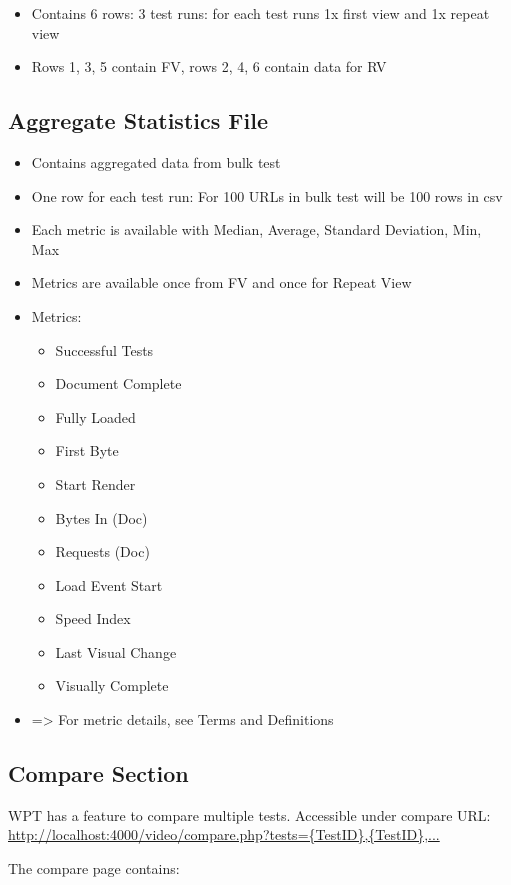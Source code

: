 \begin{itemize}
\item Contains 6 rows: 3 test runs: for each test runs 1x first view and 1x repeat view
\item Rows 1, 3, 5 contain FV, rows 2, 4, 6 contain data for RV
\end{itemize}

\subsection{Aggregate Statistics File}

\begin{itemize}
\item Contains aggregated data from bulk test
\item One row for each test run: For 100 URLs in bulk test will be 100 rows in csv
\item Each metric is available with Median, Average, Standard Deviation, Min, Max
\item Metrics are available once from FV and once for Repeat View
\item Metrics:
	\begin{itemize}
	\item Successful Tests
	\item Document Complete
	\item Fully Loaded
	\item First Byte
	\item Start Render
	\item Bytes In (Doc)
	\item Requests (Doc)
	\item Load Event Start
	\item Speed Index
	\item Last Visual Change
	\item Visually Complete
	\end{itemize}
\item => For metric details, see Terms and Definitions
\end{itemize}


\subsection{Compare Section}

WPT has a feature to compare multiple tests.
Accessible under compare URL: \url{http://localhost:4000/video/compare.php?tests={TestID},{TestID},...}

The compare page contains:

